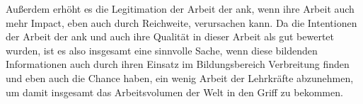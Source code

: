 Außerdem erhöht es die Legitimation der Arbeit der \gls{ank}, wenn ihre Arbeit auch mehr Impact, eben auch durch Reichweite, verursachen kann. Da die Intentionen der Arbeit der \gls{ank} und auch ihre Qualität in dieser Arbeit als gut bewertet wurden, ist es also insgesamt eine sinnvolle Sache, wenn diese bildenden Informationen auch durch ihren Einsatz im Bildungsbereich Verbreitung finden und eben auch die Chance haben, ein wenig Arbeit der Lehrkräfte abzunehmen, um damit insgesamt das Arbeitsvolumen der Welt in den Griff zu bekommen. 




